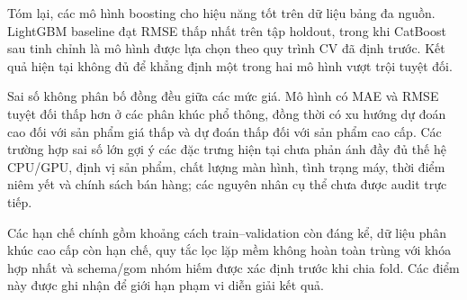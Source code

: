 Tóm lại, các mô hình boosting cho hiệu năng tốt trên dữ liệu bảng đa nguồn. LightGBM baseline đạt RMSE thấp nhất trên tập holdout, trong khi CatBoost sau tinh chỉnh là mô hình được lựa chọn theo quy trình CV đã định trước. Kết quả hiện tại không đủ để khẳng định một trong hai mô hình vượt trội tuyệt đối.

Sai số không phân bố đồng đều giữa các mức giá. Mô hình có MAE và RMSE tuyệt đối thấp hơn ở các phân khúc phổ thông, đồng thời có xu hướng dự đoán cao đối với sản phẩm giá thấp và dự đoán thấp đối với sản phẩm cao cấp. Các trường hợp sai số lớn gợi ý các đặc trưng hiện tại chưa phản ánh đầy đủ thế hệ CPU/GPU, định vị sản phẩm, chất lượng màn hình, tình trạng máy, thời điểm niêm yết và chính sách bán hàng; các nguyên nhân cụ thể chưa được audit trực tiếp.

Các hạn chế chính gồm khoảng cách train--validation còn đáng kể, dữ liệu phân khúc cao cấp còn hạn chế, quy tắc lọc lặp mềm không hoàn toàn trùng với khóa hợp nhất và schema/gom nhóm hiếm được xác định trước khi chia fold. Các điểm này được ghi nhận để giới hạn phạm vi diễn giải kết quả.
